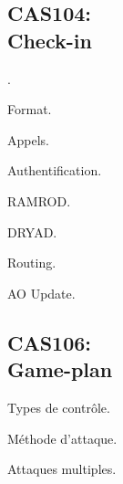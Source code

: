 \newpage


\begin{onepage}
	
	\section{CAS104:\\Check-in}
	
	\begin{e1}
		
		\item {}.
		
		\item Format.
		
		\item Appels.
		
		\item Authentification.
		
		\begin{e2}
			
			\item RAMROD.
			
			\item DRYAD.
			
		\end{e2}
		
		\item Routing.
		
		\item AO Update.
		
	\end{e1}
\end{onepage}

\newpage


\begin{onepage}
	
	\section{CAS106:\\Game-plan}
	
	\begin{e1}
		
		\item Types de contrôle.
		
		\item Méthode d'attaque.
		
		\item Attaques multiples.
		
	\end{e1}
\end{onepage}

